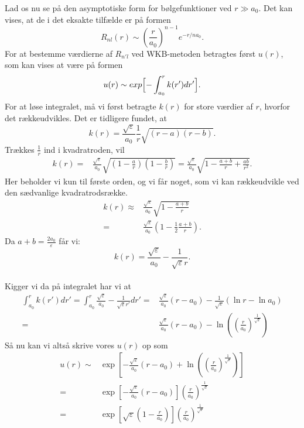 Lad os nu se på den asymptotiske form for bølgefunktioner ved $r\gg a_0$. Det kan vises, at de i det eksakte tilfælde er på formen
\begin{equation}
    R_{nl}(r) \sim \left(\frac{r}{a_0}\right)^{n-1}e^{-r/na_0}.
  \label{eq:eksatR}
\end{equation}
%
For at bestemme værdierne af $R_{n'l}$ ved WKB-metoden betragtes først $u(r)$, som kan vises at være på formen
\begin{equation}
    u(r) \sim exp\Bigl[-\int_{a_0}^{r}k(r')dr'\Bigr].
\end{equation}
For at løse integralet, må vi først betragte $k(r)$ for store værdier af $r$, hvorfor det rækkeudvikles. Det er tidligere fundet, at
\begin{equation}
    k(r) = \frac{\sqrt{\varepsilon}}{a_0}\frac{1}{r}\sqrt{(r-a)(r-b)}.
\end{equation}
Trækkes $\frac{1}{r}$ ind i kvadratroden, vil
\begin{align}
    k(r) = & \frac{\sqrt{\varepsilon}}{a_0}\sqrt{(1-\frac{a}{r})(1-\frac{b}{r})} = \frac{\sqrt{\varepsilon}}{a_0}\sqrt{1-\frac{a+b}{r}+\frac{ab}{r^2}}.
\end{align}
Her beholder vi kun til første orden, og vi får noget, som vi kan rækkeudvikle ved den sædvanlige kvadratrodsrække.
\begin{align}
  k(r) \approx & \frac{\sqrt{\varepsilon}}{a_0}\sqrt{1-\frac{a+b}{r}}\\
  = & \frac{\sqrt{\varepsilon}}{a_0}\left(1-\frac{1}{2}\frac{a+b}{r}\right).
\end{align}
Da $a+b = \frac{2a_0}{\varepsilon}$ får vi:
\begin{equation}
  k(r) = \frac{\sqrt{\varepsilon}}{a_0}-\frac{1}{\sqrt{\varepsilon}r}.
\end{equation}
\\
Kigger vi da på integralet har vi at
\begin{align}
    \int_{a_0}^{r}k(r')dr' = \int_{a_0}^{r} \frac{\sqrt{\varepsilon}}{a_0}-\frac{1}{\sqrt{\varepsilon}r'} dr'= 
& \frac{\sqrt{\varepsilon}}{a_0}(r-a_0) - \frac{1}{\sqrt{\varepsilon}}\left(\ln{r}-\ln{a_0}\right)\\
  = & \frac{\sqrt{\varepsilon}}{a_0}(r-a_0) - \ln{((\frac{r}{a_0})^{\frac{1}{\sqrt{\varepsilon}}})}
\end{align}
%
Så nu kan vi altså skrive vores $u(r)$ op som
\begin{align}
  u(r) \sim & \exp\left[-\frac{\sqrt{\varepsilon}}{a_0}(r-a_0) + \ln{((\frac{r}{a_0})^{\frac{1}{\sqrt{\varepsilon}}})}\right]\\
        = & \exp\left[-\frac{\sqrt{\varepsilon}}{a_0}(r-a_0)\right] {\left(\frac{r}{a_0}\right)}^{\frac{1}{\sqrt{\varepsilon}}}\\
    = & \exp\left[\sqrt{\varepsilon}(1-\frac{r}{a_0})\right] {\left(\frac{r}{a_0}\right)}^{\frac{1}{\sqrt{\varepsilon}}}
\end{align}
